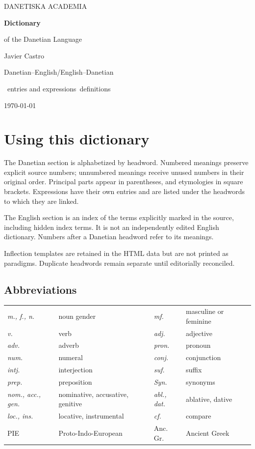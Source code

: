 \documentclass[10pt]{article}
\begin{document}
\begin{titlepage}
\centering
\vspace*{2cm}
{\large DANETISKA ACADEMIA\par}
\vspace{1.8cm}
{\Huge\bfseries Dictionary\par}
\vspace{0.3cm}
{\Large of the Danetian Language\par}
\vspace{1.5cm}
{\large Javier Castro\par}
\vfill
{\large Danetian--English\quad /\quad English--Danetian\par}
\vspace{0.7cm}
\EntryCount\ entries and expressions\quad\textbullet\quad\SenseCount\ definitions\par
\vspace{0.7cm}
\today
\end{titlepage}
\section*{Using this dictionary}
The Danetian section is alphabetized by headword. Numbered meanings preserve explicit source numbers; unnumbered meanings receive unused numbers in their original order. Principal parts appear in parentheses, and etymologies in square brackets. Expressions have their own entries and are listed under the headwords to which they are linked.

The English section is an index of the terms explicitly marked in the source, including hidden index terms. It is not an independently edited English dictionary. Numbers after a Danetian headword refer to its meanings.

Inflection templates are retained in the HTML data but are not printed as paradigms. Duplicate headwords remain separate until editorially reconciled.

\subsection*{Abbreviations}
\begin{tabular}{@{}ll@{\qquad}ll@{}}
\textit{m., f., n.} & noun gender & \textit{mf.} & masculine or feminine\\
\textit{v.} & verb & \textit{adj.} & adjective\\
\textit{adv.} & adverb & \textit{pron.} & pronoun\\
\textit{num.} & numeral & \textit{conj.} & conjunction\\
\textit{intj.} & interjection & \textit{suf.} & suffix\\
\textit{prep.} & preposition & \textit{Syn.} & synonyms\\
\textit{nom., acc., gen.} & nominative, accusative, genitive & \textit{abl., dat.} & ablative, dative\\
\textit{loc., ins.} & locative, instrumental & \textit{cf.} & compare\\
PIE & Proto-Indo-European & Anc. Gr. & Ancient Greek\\
\end{tabular}
\clearpage
\end{document}
